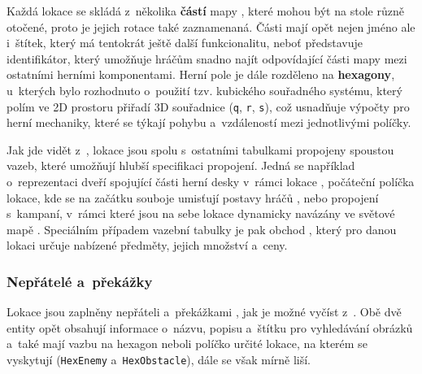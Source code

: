 Každá lokace se skládá z~několika \textbf{částí} mapy , které mohou být na stole různě otočené, proto je jejich rotace  také zaznamenaná. Části mají opět nejen jméno ale i~štítek, který má tentokrát ještě další funkcionalitu, neboť představuje identifikátor, který umožňuje hráčům snadno najít odpovídající části mapy mezi ostatními herními komponentami. Herní pole je dále rozděleno na \textbf{hexagony}, u~kterých bylo rozhodnuto o~použití tzv. kubického souřadného systému, který polím ve 2D prostoru přiřadí 3D souřadnice (\texttt{q}, \texttt{r}, \texttt{s}), což usnadňuje výpočty pro herní mechaniky, které se týkají pohybu a~vzdáleností mezi jednotlivými políčky.

Jak jde vidět z~, lokace jsou spolu s~ostatními tabulkami propojeny spoustou vazeb, které umožňují hlubší specifikaci propojení. Jedná se například o~reprezentaci dveří spojující části herní desky v~rámci lokace , počáteční políčka lokace, kde se na začátku souboje umisťují postavy hráčů , nebo propojení s~kampaní, v~rámci které jsou na sebe lokace dynamicky navázány ve světové mapě . Speciálním případem vazební tabulky je pak obchod , který pro danou lokaci určuje nabízené předměty, jejich množství a~ceny.

\subsubsection*{Nepřátelé a~překážky}
\label{subsubsec:schema_enemy_obstacle}

Lokace jsou zaplněny nepřáteli  a~překážkami , jak je možné vyčíst z~. Obě dvě entity opět obsahují informace o~názvu, popisu a~štítku pro vyhledávání obrázků a~také mají vazbu na hexagon neboli políčko určité lokace, na kterém se vyskytují (\texttt{HexEnemy} a~\texttt{HexObstacle}), dále se však mírně liší.

